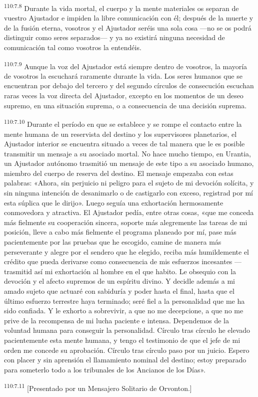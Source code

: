 \par
\textsuperscript{110:7.8} Durante la vida mortal, el cuerpo y la mente materiales os separan de vuestro Ajustador e impiden la libre comunicación con él; después de la muerte y de la fusión eterna, vosotros y el Ajustador seréis una sola cosa ---no se os podrá distinguir como seres separados--- y ya no existirá ninguna necesidad de comunicación tal como vosotros la entendéis.

\par
\textsuperscript{110:7.9} Aunque la voz del Ajustador está siempre dentro de vosotros, la mayoría de vosotros la escuchará raramente durante la vida. Los seres humanos que se encuentran por debajo del tercero y del segundo círculos de consecución escuchan raras veces la voz directa del Ajustador, excepto en los momentos de un deseo supremo, en una situación suprema, o a consecuencia de una decisión suprema.

\par
\textsuperscript{110:7.10} Durante el período en que se establece y se rompe el contacto entre la mente humana de un reservista del destino y los supervisores planetarios, el Ajustador interior se encuentra situado a veces de tal manera que le es posible transmitir un mensaje a su asociado mortal. No hace mucho tiempo, en Urantia, un Ajustador autónomo trasmitió un mensaje de este tipo a su asociado humano, miembro del cuerpo de reserva del destino. El mensaje empezaba con estas palabras: «Ahora, sin perjuicio ni peligro para el sujeto de mi devoción solícita, y sin ninguna intención de desanimarlo o de castigarlo con exceso, registrad por mí esta súplica que le dirijo». Luego seguía una exhortación hermosamente conmovedora y atractiva. El Ajustador pedía, entre otras cosas, «que me conceda más fielmente su cooperación sincera, soporte más alegremente las tareas de mi posición, lleve a cabo más fielmente el programa planeado por mí, pase más pacientemente por las pruebas que he escogido, camine de manera más perseverante y alegre por el sendero que he elegido, reciba más humildemente el crédito que pueda derivarse como consecuencia de mis esfuerzos incesantes ---trasmitid así mi exhortación al hombre en el que habito. Le obsequio con la devoción y el afecto supremos de un espíritu divino. Y decidle además a mi amado sujeto que actuaré con sabiduría y poder hasta el final, hasta que el último esfuerzo terrestre haya terminado; seré fiel a la personalidad que me ha sido confiada. Y le exhorto a sobrevivir, a que no me decepcione, a que no me prive de la recompensa de mi lucha paciente e intensa. Dependemos de la voluntad humana para conseguir la personalidad. Círculo tras círculo he elevado pacientemente esta mente humana, y tengo el testimonio de que el jefe de mi orden me concede su aprobación. Círculo tras círculo paso por un juicio. Espero con placer y sin aprensión el llamamiento nominal del destino; estoy preparado para someterlo todo a los tribunales de los Ancianos de los Días».

\par
\textsuperscript{110:7.11} [Presentado por un Mensajero Solitario de Orvonton.]